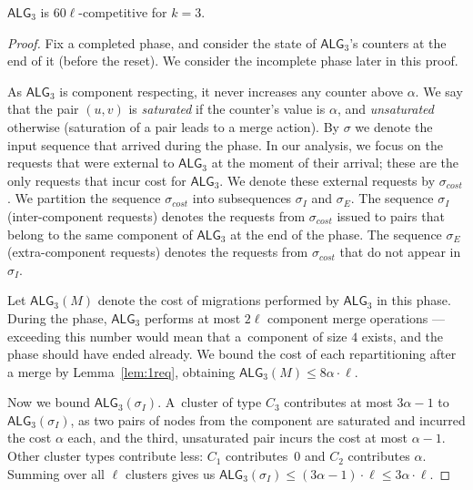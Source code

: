 \documentclass[a4paper,anonymous,USenglish]{lipics-v2019}
\newcommand{\TAlg}{{\ensuremath{\textsf{ALG}_{3}}}\xspace}
\begin{document}
\begin{theorem}
	\TAlg is $60\ell$-competitive for $k=3$.
\end{theorem}
\begin{proof}
	Fix a completed phase, and consider the state of \TAlg's counters at the end of it (before the reset).
	We consider the incomplete phase later in this proof.
	
	As \TAlg is component respecting, it never increases any counter above $\alpha$.
	We say that the pair $(u, v)$ is \emph{saturated} if the counter's value is $\alpha$, and \emph{unsaturated} otherwise (saturation of a pair leads to a merge action).
	By $\sigma$ we denote the input sequence that arrived during the phase.
	In our analysis, we focus on the requests that were external to \TAlg at the moment of their arrival; these are the only requests that incur cost for \TAlg.
	We denote these external requests by $\sigma_{cost}$.
	We partition the sequence $\sigma_{cost}$ into subsequences $\sigma_I$ and $\sigma_E$.
	The sequence $\sigma_I$ (inter-component requests) denotes the requests from $\sigma_{cost}$ issued to pairs that belong to the same component of \TAlg at the end of the phase.
	The sequence $\sigma_E$ (extra-component requests) denotes the requests from $\sigma_{cost}$ that do not appear in $\sigma_I$.
	
	
	Let $\TAlg(M)$ denote the cost of migrations performed by \TAlg in this phase.
	During the phase, \TAlg performs at most $2 \ell$ component merge operations ---
	exceeding this number would mean that a~component of size $4$ exists, and the phase should have ended already.
	We bound the cost of each repartitioning after a merge by Lemma~\ref{lem:1req}, obtaining $\TAlg(M) \leq 8\alpha\cdot\ell$.
	
	Now we bound $\TAlg(\sigma_I)$.
	A~cluster of type $C_3$ contributes at most $3 \alpha - 1$ to $\TAlg(\sigma_I)$, as two pairs of nodes from the component are saturated and incurred the cost $\alpha$ each, and the third, unsaturated pair incurs the cost at most $\alpha-1$.
	Other cluster types contribute less: $C_1$ contributes~$0$ and $C_2$ contributes $\alpha$.
	Summing over all $\ell$ clusters gives us $\TAlg(\sigma_I) \leq (3 \alpha-1)\cdot \ell \leq 3\alpha\cdot\ell$.
	

\end{proof}
\end{document}
